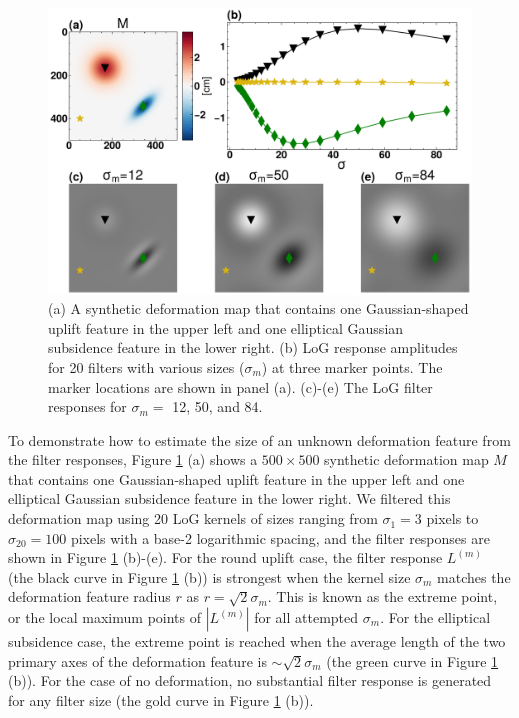 \begin{figure}
	\centering
	\includegraphics[width=0.98\linewidth]{figures/chapter6-blobs/figure2_log_response.pdf}
	\caption[Example LoG filter responses for synthetic deformation]{
		(a) A synthetic deformation map that contains one Gaussian-shaped uplift feature in the upper left and one elliptical Gaussian subsidence feature in the lower right. (b) LoG response amplitudes for 20 filters with various sizes ($\sigma_m$) at three marker points. The marker locations are shown in panel (a). (c)-(e) The LoG filter responses for $\sigma_m=$ 12, 50, and 84.}
	\label{fig:log-response}
\end{figure}


To demonstrate how to estimate the size of an unknown deformation feature from the filter responses, Figure \ref{fig:log-response} (a) shows a $500 \times 500$ synthetic deformation map $M$ that contains one Gaussian-shaped uplift feature in the upper left and one elliptical Gaussian subsidence feature in the lower right. We filtered this deformation map using 20 LoG kernels of sizes ranging from $\sigma_1 = 3$ pixels to $\sigma_{20} = 100$ pixels with a base-2 logarithmic spacing, and the filter responses are shown in Figure \ref{fig:log-response} (b)-(e). For the round uplift case, the filter response $L^{(m)}$ (the black curve in Figure \ref{fig:log-response} (b)) is strongest when the kernel size $\sigma_m$ matches the deformation feature radius $r$ as $r = \sqrt{2}\sigma_m$. This is known as the extreme point, or the local maximum points of $|L^{(m)}|$ for all attempted $\sigma_m$. For the elliptical subsidence case, the extreme point is reached when the average length of the two primary axes of the deformation feature is $\sim \sqrt{2}\sigma_m$ (the green curve in Figure \ref{fig:log-response} (b)). For the case of no deformation, no substantial filter response is generated for any filter size (the gold curve in Figure \ref{fig:log-response} (b)).



